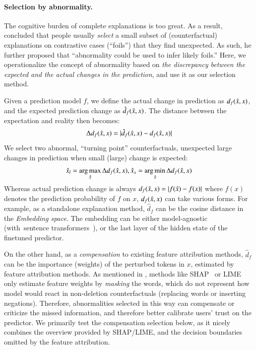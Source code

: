 \paragraph{Selection by abnormality.}
The cognitive burden of complete explanations is too great.
As a result, \citet{miller} concluded that people usually \emph{select} a small subset of (counterfactual) explanations on contrastive cases (``foils'') that they find unexpected. 
As such, he further proposed that ``abnormality could be used to infer likely foils.''
Here, we operationalize the concept of abnormality based on \emph{the discrepancy between the expected and the actual changes in the prediction}, and use it as our selection method.

Given a prediction model $f$, we define the actual change in prediction as $d_f(\hat{x}, x)$, and the expected prediction change as $\hat{d}_f(\hat{x}, x)$.
The distance between the expectation and reality then becomes:
$$\Delta d_f(\hat{x}, x) = |\hat{d}_f(\hat{x}, x)-d_f(\hat{x}, x)|$$
We select two abnormal, ``turning point'' counterfactuals, \ie unexpected large changes in prediction when small (large) change is expected:
$$ \hat{x}_l = \operatorname*{arg\,max}_{\hat{x}} \Delta d_f(\hat{x}, x), \hat{x}_s = \operatorname*{arg\,min}_{\hat{x}} \Delta d_f(\hat{x}, x)$$
Whereas actual prediction change is always $d_f(\hat{x}, x)=|f(\hat{x})-f(x)|$ where $f(x)$ denotes the prediction probability of $f$ on $x$, $d_f(\hat{x}, x)$ can take various forms. 
For example, as a standalone explanation method, $\hat{d}_f$ can be the cosine distance in the \emph{Embedding space}.
The embedding can be either model-agnostic (\eg with~sentence transformers~\cite{reimers-2019-sentence-bert}), or the last layer of the hidden state of the finetuned predictor.

On the other hand, as a \emph{compensation} to existing feature attribution methods, $\hat{d}_f$ can be the importance (weights) of the perturbed tokens in $x$, estimated by feature attribution methods.
As mentioned in \wts{\S\ref{}}, methods like SHAP~\cite{} or LIME~\cite{} only estimate feature weights by \emph{masking} the words, which do not represent how model would react in non-deletion counterfactuals (replacing words or inserting negations).
Therefore, abnormalities selected in this way can  compensate or criticize the missed information, and therefore better calibrate users' trust on the predictor.
We primarily test the compensation selection below, as it nicely combines the overview provided by SHAP/LIME, and the decision boundaries omitted by the feature attribution. 



